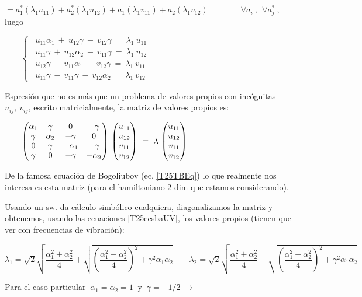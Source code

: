 $=a_1^*(\lambda_1 u_{11}) +a_2^*(\lambda_1 u_{12})+a_1(\lambda_1v_{11})+a_2(\lambda_1v_{12}) \qquad \qquad \forall a_i\ , \ \ \forall a_j^* \ , \ \qquad$ luego

$\qquad 
\begin{cases}
\ \ u_{11} \alpha_1 \ + \ u_{12}  \gamma \ - \ v_{12}  \gamma \ = \ \lambda_1\ u_{11}  \\
\ \ u_{11} \gamma \ + \ u_{12}  \alpha_2 \ - \ v_{11}  \gamma \ = \ \lambda_1\ u_{12}  \\	
\ \ u_{12} \gamma \ - \ v_{11}  \alpha_1 \ - \ v_{12}  \gamma \ = \ \lambda_1\ v_{11}  \\
\ \ u_{11} \gamma \ - \ v_{11}  \gamma \ - \ v_{12}  \alpha_2 \ = \ \lambda_1\ v_{12}  
\end{cases}$

Espresión que no es más que un problema de valores propios con incógnitas $u_{ij},\ v_{ij}$, escrito matricialmente, la matriz de valores propios es:



$\qquad \mqty(\alpha_1&\gamma&0&-\gamma \\ \gamma&\alpha_2&-\gamma&0\\ 0&\gamma&-\alpha_1&-\gamma\\ \gamma&0&-\gamma&-\alpha_2) \ \mqty(u_{11}\\ u_{12} \\ v_{11} \\ v_{12}) \ = \ \lambda \ \mqty(u_{11}\\ u_{12} \\ v_{11} \\ v_{12})$


De la famosa ecuación de Bogoliubov (ec. \ref{T25TBEq}) lo que realmente nos interesa es esta matriz (para el hamiltoniano 2-dim que estamos considerando).

Usando un sw. da cálculo simbólico cualquiera, diagonalizamos la matriz y obtenemos, usando las ecuaciones \ref{T25ecsbaUV}, los valores propios (tienen que ver con frecuencias de vibración):

$\lambda_1=\sqrt{2} \sqrt{\dfrac{\alpha_1^2+\alpha_2^2}{4} + \sqrt{ \left( \dfrac{\alpha_1^2-\alpha_2^2}{4} \right)^2 +\gamma^2 \alpha_1 \alpha_2 } }
\qquad
\lambda_2=\sqrt{2} \sqrt{\dfrac{\alpha_1^2+\alpha_2^2}{4} - \sqrt{ \left( \dfrac{\alpha_1^2-\alpha_2^2}{4} \right)^2 +\gamma^2 \alpha_1 \alpha_2 } }
$

Para el caso particular $\ \alpha_1=\alpha_2=1 \ \text{ y } \ \gamma=-1/2\  \to $

